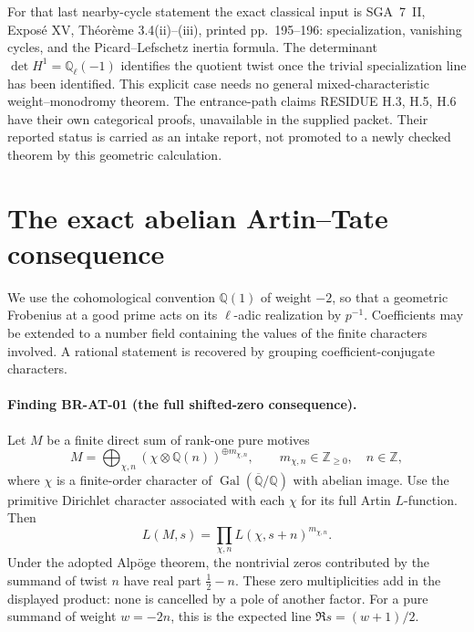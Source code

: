 \documentclass[11pt,a4paper]{article}
\theoremstyle{definition}\newtheorem{definition}[theorem]{Definition}
\theoremstyle{remark}\newtheorem{remark}[theorem]{Remark}
\begin{document}
For that last nearby-cycle statement the exact classical input is
SGA~7~II, Expos\'e XV, Th\'eor\`eme 3.4(ii)--(iii), printed
pp.~195--196: specialization, vanishing cycles, and the
Picard--Lefschetz inertia formula. The determinant
$\det H^1=\mathbb Q_\ell(-1)$ identifies the quotient twist once
the trivial specialization line has been identified. This explicit
case needs no general mixed-characteristic weight--monodromy theorem.
The entrance-path claims RESIDUE H.3, H.5, H.6 have their own
categorical proofs, unavailable in the supplied packet. Their
reported status is carried as an intake report, not promoted to a
newly checked theorem by this geometric calculation.


\section{The exact abelian Artin--Tate consequence}
\label{sec:root-artin-tate}

We use the cohomological convention $\mathbb Q(1)$ of weight $-2$,
so that a geometric Frobenius at a good prime acts on its $\ell$-adic
realization by $p^{-1}$.  Coefficients may be extended to a number field
containing the values of the finite characters involved.  A rational
statement is recovered by grouping coefficient-conjugate characters.

\paragraph{Finding BR-AT-01 (the full shifted-zero consequence).}
Let $M$ be a finite direct sum of rank-one pure motives
\[
 M=\bigoplus_{\chi,n} (\chi\otimes\mathbb Q(n))^{\oplus m_{\chi,n}},
 \qquad m_{\chi,n}\in\mathbb Z_{\geq0},\quad n\in\mathbb Z,
\]
where $\chi$ is a finite-order character of
$\operatorname{Gal}(\overline{\mathbb Q}/\mathbb Q)$ with abelian image.
Use the primitive Dirichlet character associated with each $\chi$ for
its full Artin $L$-function.  Then
\[
 L(M,s)=\prod_{\chi,n}L(\chi,s+n)^{m_{\chi,n}}.
\]
Under the adopted Alp\"oge theorem, the nontrivial zeros contributed by
the summand of twist $n$ have real part $\tfrac12-n$.
These zero multiplicities add in the displayed product: none is cancelled
by a pole of another factor.  For a pure summand of weight $w=-2n$, this
is the expected line $\Re s=(w+1)/2$.
\end{document}

